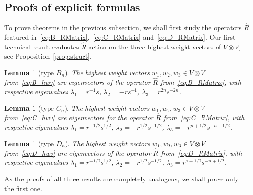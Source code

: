 \documentclass[pdftex]{sigma}
\numberwithin{equation}{section}
\newtheorem{Lemma}[Theorem]{Lemma}
\begin{document}
\subsection{Proofs of explicit formulas}%

To prove theorems in the previous subsection, we shall first study the operators $\hat{R}$ featured in~\eqref{eq:B_RMatrix},~\eqref{eq:C_RMatrix} and~\eqref{eq:D_RMatrix}. Our first technical result evaluates $\hat{R}$-action on the three highest weight vectors of $V\otimes V$, see Proposition~\ref{prop:struct}.

\begin{Lemma}[type $B_{n}$]\label{lem:B_eigen}
The highest weight vectors $w_{1}, w_{2}, w_{3}\in V\otimes V$ from~\eqref{eq:B_hwv} are eigenvectors of the operator $\hat{R}$ from~\eqref{eq:B_RMatrix}, with respective eigenvalues $\lambda_{1}=r^{-1}s$, $\lambda_{2} = -rs^{-1}$, $\lambda_{3} = r^{2n}s^{-2n}$.
\end{Lemma}

\begin{Lemma}[type $C_{n}$]\label{lem:C_eigen}
The highest weight vectors $w_{1}, w_{2}, w_{3}\in V\otimes V$ from~\eqref{eq:C_hwv} are eigenvectors for the operator $\hat{R}$ from~\eqref{eq:C_RMatrix}, with respective eigenvalues $\lambda_{1} = r^{-1/2}s^{1/2}$, $\lambda_{2} = -r^{1/2}s^{-1/2}$, $\lambda_{3} = -r^{n + 1/2}s^{-n-1/2}$.
\end{Lemma}

\begin{Lemma}[type $D_{n}$]\label{lem:D_eigen}
The highest weight vectors $w_{1}, w_{2}, w_{3}\in V\otimes V$ from~\eqref{eq:D_hwv} are eigenvectors of the operator $\hat{R}$ from~\eqref{eq:D_RMatrix}, with respective eigenvalues $\lambda_{1} = r^{-1/2}s^{1/2}$, $\lambda_{2} = -r^{1/2}s^{-1/2}$, $\lambda_{3} = r^{n-1/2}s^{-n+1/2}$.
\end{Lemma}

As the proofs of all three results are completely analogous, we shall prove only the first one.
\end{document}
